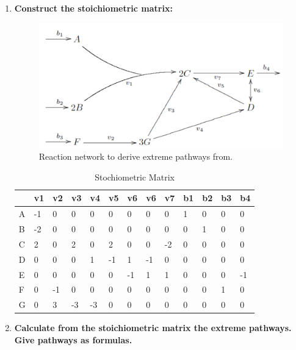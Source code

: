 \documentclass[10pt,a4paper]{article}
\begin{document}
\begin{enumerate}

\item \textbf{Construct the stoichiometric matrix:}\\ 



\begin{figure}[H]
	\centering
	\includegraphics[width=0.7\linewidth]{img/ex1}
	\caption{Reaction network to derive extreme pathways from.}
	\label{fig:ex1}
\end{figure}


\begin{table}[H]
	\centering
	\caption{Stochiometric Matrix}
	\label{stociometric1}
	\begin{tabular}{|l|l|l|l|l|l|l|l|l|l|l|l|l|}
		\hline
		& v1 & v2 & v3 & v4 & v5 & v6 & v6 & v7 & b1 & b2 & b3 & b4 \\ \hline
		A & -1 & 0  & 0  & 0  & 0  & 0  & 0  & 0  & 1  & 0  & 0  & 0  \\ \hline
		B & -2 & 0  & 0  & 0  & 0  & 0  & 0  & 0  & 0  & 1  & 0  & 0  \\ \hline
		C & 2  & 0  & 2  & 0  & 2  & 0  & 0  & -2 & 0  & 0  & 0  & 0  \\ \hline
		D & 0  & 0  & 0  & 1  & -1 & 1  & -1 & 0  & 0  & 0  & 0  & 0  \\ \hline
		E & 0  & 0  & 0  & 0  & 0  & -1 & 1  & 1  & 0  & 0  & 0  & -1 \\ \hline
		F & 0  & -1 & 0  & 0  & 0  & 0  & 0  & 0  & 0  & 0  & 1  & 0  \\ \hline
		G & 0  & 3  & -3 & -3 & 0  & 0  & 0  & 0  & 0  & 0  & 0  & 0  \\ \hline
	\end{tabular}
\end{table}



\item \textbf{Calculate from the stoichiometric matrix the extreme pathways. Give pathways as formulas.} \\


\end{enumerate}
\end{document}
